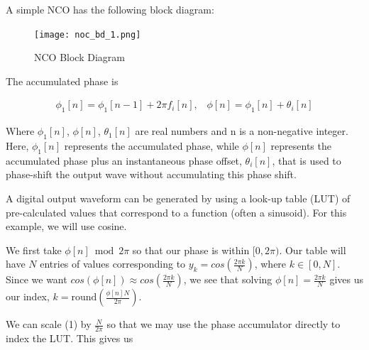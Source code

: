 \documentclass{article}
\begin{document}
        A simple NCO has the following block diagram:
        
        \medskip

        \begin{figure}[!ht]
            \centering
            \texttt{[image: noc\_bd\_1.png]}
            \caption{NCO Block Diagram}
            \label{fig:fig1}
        \end{figure}

        The accumulated phase is

        \begin{gather}
            \phi_1[n] = \phi_1[n-1] + 2 \pi f_i [n], \; \; \;
            \phi[n] = \phi_1[n] + \theta_i[n]
        \end{gather}

        Where $\phi_1[n]$, $\phi[n]$, $\theta_1[n]$ are real numbers and n
        is a non-negative integer. Here, $\phi_1[n]$ represents the accumulated
        phase, while $\phi[n]$ represents the accumulated phase plus an 
        instantaneous phase offset, $\theta_i[n]$, that is used to phase-shift
        the output wave without accumulating this phase shift.

        \vspace{3mm}
        
        A digital output waveform can be generated by using a look-up table 
        (LUT) of pre-calculated values that correspond to a function (often a
        sinusoid). For this example, we will use cosine.

        \vspace{3mm}

        We first take $\phi[n] \bmod 2\pi$ so that our phase is within 
        $[0, 2\pi)$. Our table will have $N$ entries of values corresponding to
        $y_k = cos(\frac{2\pi k}{N})$, where $k \in [0, N]$. Since we want
        $cos(\phi[n]) \approx cos(\frac{2\pi k}{N})$, we see that solving 
        $\phi [n] = \frac{2 \pi k}{N}$ gives us our index, 
        $k = \text{round}(\frac{\phi [n] N}{2 \pi})$. 

        \vspace{3mm}

        \newpage

        We can scale (1) by $\frac{N}{2 \pi}$ so that we may use
        the phase accumulator directly to index the LUT. This gives us
\end{document}
